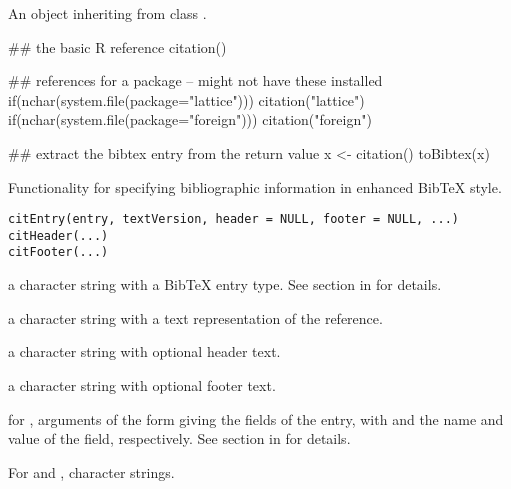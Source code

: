 %
\begin{Value}
An object inheriting from class .
\end{Value}
%
\begin{SeeAlso}\relax
{}
\end{SeeAlso}
%
\begin{Examples}
\begin{ExampleCode}
## the basic R reference
citation()

## references for a package -- might not have these installed
if(nchar(system.file(package="lattice"))) citation("lattice")
if(nchar(system.file(package="foreign"))) citation("foreign")

## extract the bibtex entry from the return value
x <- citation()
toBibtex(x)
\end{ExampleCode}
\end{Examples}
%
\begin{Description}\relax
Functionality for specifying bibliographic information in enhanced
BibTeX style.
\end{Description}
%
\begin{Usage}
\begin{verbatim}
citEntry(entry, textVersion, header = NULL, footer = NULL, ...)
citHeader(...)
citFooter(...)
\end{verbatim}
\end{Usage}
%
\begin{Arguments}
\begin{ldescription}
\item[\code{entry}] a character string with a BibTeX entry type.
See section  in  for
details.

\item[\code{textVersion}] a character string with a text representation of
the reference.
\item[\code{header}] a character string with optional header text.
\item[\code{footer}] a character string with optional footer text.
\item[\code{...}] for , arguments of the form
 giving the fields of the entry, with
 and  the name and value of the field,
respectively.
See section  in  for
details.

For  and , character strings.

\end{ldescription}
\end{Arguments}
